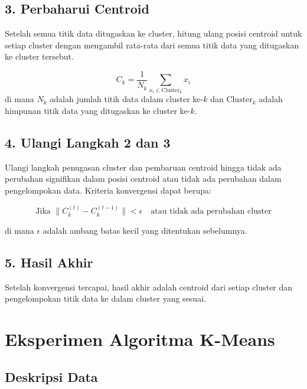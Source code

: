 \documentclass[
  oneside]{book}
\begin{document}
\subsection*{3. Perbaharui Centroid}\label{perbaharui-centroid}

Setelah semua titik data ditugaskan ke cluster, hitung ulang posisi centroid untuk setiap cluster dengan mengambil rata-rata dari semua titik data yang ditugaskan ke cluster tersebut.

\[
C_k = \frac{1}{N_k} \sum_{x_i \in \text{Cluster}_k} x_i
\]
di mana \(N_k\) adalah jumlah titik data dalam cluster ke-\(k\) dan \(\text{Cluster}_k\) adalah himpunan titik data yang ditugaskan ke cluster ke-\(k\).

\subsection*{4. Ulangi Langkah 2 dan 3}\label{ulangi-langkah-2-dan-3}

Ulangi langkah penugasan cluster dan pembaruan centroid hingga tidak ada perubahan signifikan dalam posisi centroid atau tidak ada perubahan dalam pengelompokan data. Kriteria konvergensi dapat berupa:

\[
\text{Jika } \| C_k^{(t)} - C_k^{(t-1)} \| < \epsilon \quad \text{atau tidak ada perubahan cluster}
\]

di mana \(\epsilon\) adalah ambang batas kecil yang ditentukan sebelumnya.

\subsection*{5. Hasil Akhir}\label{hasil-akhir}

Setelah konvergensi tercapai, hasil akhir adalah centroid dari setiap cluster dan pengelompokan titik data ke dalam cluster yang sesuai.

\section{Eksperimen Algoritma K-Means}\label{eksperimen-algoritma-k-means}

\subsection*{Deskripsi Data}\label{deskripsi-data}
\end{document}
